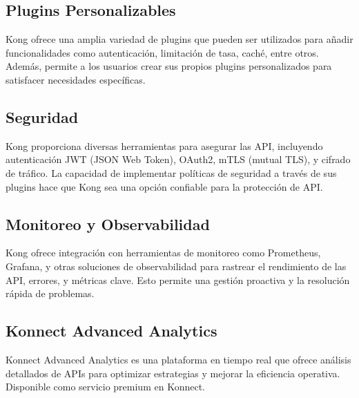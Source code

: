 \subsection{Plugins Personalizables}
Kong ofrece una amplia variedad de plugins que pueden ser utilizados para añadir 
funcionalidades como autenticación, limitación de tasa, caché, entre otros. Además, 
permite a los usuarios crear sus propios plugins personalizados para satisfacer necesidades específicas.

\subsection{Seguridad}
Kong proporciona diversas herramientas para asegurar las API, incluyendo autenticación 
JWT (JSON Web Token), OAuth2, mTLS (mutual TLS), y cifrado de tráfico. 
La capacidad de implementar políticas de seguridad a través de sus plugins 
hace que Kong sea una opción confiable para la protección de API.


\subsection{Monitoreo y Observabilidad}
Kong ofrece integración con herramientas de monitoreo como Prometheus, Grafana, y 
otras soluciones de observabilidad para rastrear el rendimiento de las API, errores,
y métricas clave. Esto permite una gestión proactiva y la resolución rápida de problemas.

\subsection{Konnect Advanced Analytics}
Konnect Advanced Analytics es una plataforma en tiempo real que ofrece análisis detallados 
de APIs para optimizar estrategias y mejorar la eficiencia operativa. Disponible como 
servicio premium en Konnect. \cite{konnect-advanced-analytics}

